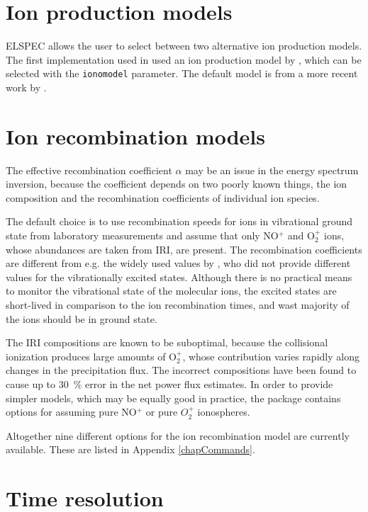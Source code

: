 \documentclass[12pt,a4paper]{report}
\begin{document}
\section{Ion production models}

ELSPEC allows the user to select between two alternative ion production models. The first implementation used in \cite{dahlgren2011} used an ion production model by \citep{sergienko1993}, which can be selected with the \verb|ionomodel| parameter. The default model is from a more recent work by \citep{fang2010}. 


\section{Ion recombination models}

The effective recombination coefficient $\alpha$ may be an issue in the energy spectrum inversion, because the coefficient depends on two poorly known things, the ion composition and the recombination coefficients of individual ion species. 

The default choice is to use recombination speeds for ions in vibrational ground state from laboratory measurements \citep{sheehan2004} and assume that only NO$^+$ and O$_2^+$ ions, whose abundances are taken from IRI, are present.  The recombination coefficients are different from e.g. the widely used values by \cite{rees1989}, who did not provide different values for the vibrationally excited states. Although there is no practical means to monitor the vibrational state of the molecular ions, the excited states are short-lived in comparison to the ion recombination times, and wast majority of the ions should be in ground state. 

The IRI compositions are known to be suboptimal, because the collisional ionization produces large amounts of O$_2^+$, whose contribution varies rapidly along changes in the precipitation flux. The incorrect compositions have been found to cause up to 30~\% error in the net power flux estimates. In order to provide simpler models, which may be equally good in practice, the package contains options for assuming pure NO$^+$ or pure $O_2^+$ ionospheres. 

Altogether nine different options for the ion recombination model are currently available. These are listed in Appendix \ref{chapCommands}.

\section{Time resolution}
\end{document}
